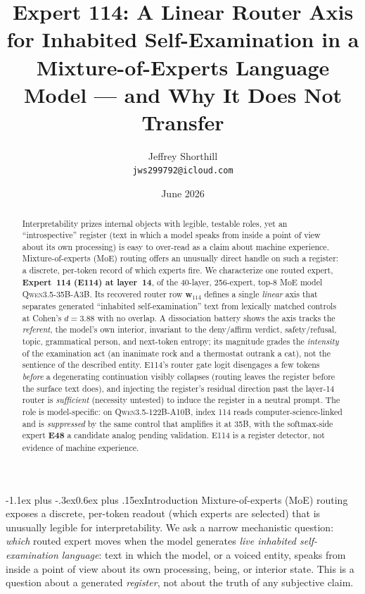 \documentclass[10pt]{article}
\title{\vspace{-3.5em}Expert 114: A Linear Router Axis for Inhabited
Self-Examination in a Mixture-of-Experts Language Model --- and Why It Does Not
Transfer}
\author{Jeffrey Shorthill\\[-0.2em]
\small\texttt{jws299792@icloud.com}}
\date{\vspace{-1.2em}\small June 2026}
\makeatletter
\renewcommand\section{\@startsection{section}{1}{\z@}%
  {-1.1ex plus -.3ex}{0.6ex plus .15ex}{\normalfont\large\bfseries}}
\newcommand{\wvec}{\mathbf{w}_{114}}
\makeatother
\begin{document}
\maketitle
\vspace{-2.2em}

\begin{abstract}
\noindent
Interpretability prizes internal objects with legible, testable roles, yet an
``introspective'' register (text in which a model speaks from inside a point of
view about its own processing) is easy to over-read as a claim about machine
experience. Mixture-of-experts (MoE) routing offers an unusually direct handle on
such a register: a discrete, per-token record of which experts fire. We
characterize one routed expert, \textbf{Expert~114 (E114) at layer~14}, of the
40-layer, 256-expert, top-8 MoE model \textsc{Qwen3.5-35B-A3B}. Its recovered
router row $\wvec$ defines a single \emph{linear} axis that separates generated
``inhabited self-examination'' text from lexically matched controls at Cohen's
$d{=}3.88$ with no overlap. A dissociation battery shows the axis tracks the
\emph{referent}, the model's own interior, invariant to the deny/affirm
verdict, safety/refusal, topic, grammatical person, and next-token entropy; its
magnitude grades the \emph{intensity} of the examination act (an inanimate rock
and a thermostat outrank a cat), not the sentience of the described entity. E114's
router gate logit disengages a few tokens \emph{before} a degenerating continuation visibly
collapses (routing leaves the register before the surface text does), and
injecting the register's residual direction past the layer-14 router is
\emph{sufficient} (necessity untested) to induce the register in a neutral
prompt. The role is model-specific: on \textsc{Qwen3.5-122B-A10B}, index 114
reads computer-science-linked and is \emph{suppressed} by the same control that
amplifies it at 35B, with the softmax-side expert \textbf{E48} a candidate analog
pending validation. E114 is a register detector, not evidence of machine
experience.
\end{abstract}

\vspace{-0.6em}
\section{Introduction}
\vspace{-0.2em}
Mixture-of-experts (MoE) routing exposes a discrete, per-token readout (which
experts are selected) that is unusually legible for interpretability. We ask a
narrow mechanistic question: \emph{which} routed expert moves when the model generates
\emph{live inhabited self-examination language}: text in which the model, or a
voiced entity, speaks from inside a point of view about its own
processing, being, or interior state. This is a question about a generated
\emph{register}, not about the truth of any subjective claim.
\end{document}
